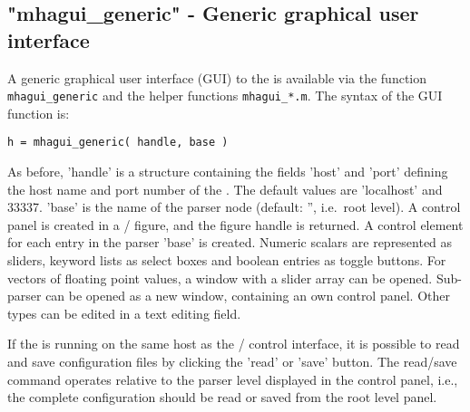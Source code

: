 \subsection{"mhagui\_generic" - Generic graphical user interface}
\label{sec:mhagui_generic}

A generic graphical user interface (GUI) to the \mhad{} is available
via the function \verb!mhagui_generic! and the helper functions
\verb!mhagui_*.m!.
%
The syntax of the GUI function is:
\begin{verbatim}
h = mhagui_generic( handle, base )
\end{verbatim}
%
As before, 'handle' is a structure containing the fields 'host' and
'port' defining the host name and port number of the \mhad{}. The
default values are 'localhost' and 33337.
%
'base' is the name of the \mha{} parser node (default: '', i.e.\ root level).
%
A control panel is created in a \Octave{}/ \Matlab{} figure, and the figure
handle is returned.
%
A control element for each entry in the parser 'base' is created.
%
Numeric scalars are represented as sliders, keyword lists as select
boxes and boolean entries as toggle buttons.
%
For vectors of floating point values, a window with a slider array can
be opened.
%
Sub-parser can be opened as a new window, containing an own control
panel.
%
Other types can be edited in a text editing field.

If the \mha{} is running on the same host as the \Octave{}/ \Matlab{} control
interface, it is possible to read and save \mha{} configuration files by
clicking the 'read' or 'save' button. The read/save command operates
relative to the \mha{} parser level displayed in the control panel, i.e.,
the complete configuration should be read or saved from the root level
panel.



